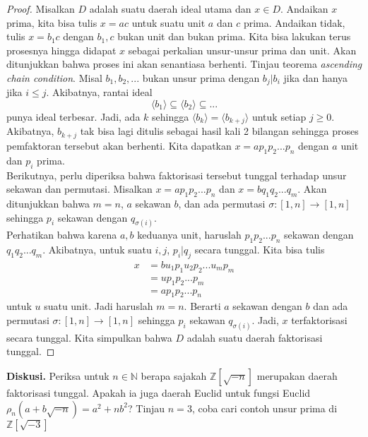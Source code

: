 	\begin{proof}
		Misalkan $D$ adalah suatu daerah ideal utama dan $x \in D$. Andaikan $x$ prima, kita bisa tulis $x = ac$ untuk suatu unit $a$ dan $c$ prima. Andaikan tidak, tulis $x = b_1 c$ dengan $b_1, c$ bukan unit dan bukan prima. Kita bisa lakukan terus prosesnya hingga didapat $x$ sebagai perkalian unsur-unsur prima dan unit. Akan ditunjukkan bahwa proses ini akan senantiasa berhenti. Tinjau teorema \textit{ascending chain condition}. Misal $b_1, b_2, ...$ bukan unsur prima dengan $b_j | b_i$ jika dan hanya jika $i \le j$. Akibatnya, rantai ideal $$\langle b_1 \rangle \subseteq \langle b_2 \rangle \subseteq ...$$punya ideal terbesar. Jadi, ada $k$ sehingga $\langle b_k \rangle = \langle b_{k+j} \rangle$ untuk setiap $j \ge 0$. Akibatnya, $b_{k+j}$ tak bisa lagi ditulis sebagai hasil kali 2 bilangan sehingga proses pemfaktoran tersebut akan berhenti. Kita dapatkan $x = ap_1p_2...p_n$ dengan $a$ unit dan $p_i$ prima.\\
		
		Berikutnya, perlu diperiksa bahwa faktorisasi tersebut tunggal terhadap unsur sekawan dan permutasi. Misalkan $x = ap_1p_2...p_n$ dan $x = bq_1q_2...q_m$. Akan ditunjukkan bahwa $m = n$, $a$ sekawan $b$, dan ada permutasi $\sigma: [1,n] \rightarrow [1,n]$ sehingga $p_i$ sekawan dengan $q_{\sigma(i)}$.\\
		
		Perhatikan bahwa karena $a,b$ keduanya unit, haruslah $p_1p_2...p_n$ sekawan dengan $q_1q_2...q_m$. Akibatnya, untuk suatu $i,j$, $p_i | q_j$ secara tunggal. Kita bisa tulis \begin{equation*}
		\begin{split}
			x & = b u_1 p_1 u_2 p_2 ... u_m p_m\\
			& = u p_1 p_2 ... p_m\\
			& = ap_1p_2...p_n
		\end{split}
		\end{equation*}
		untuk $u$ suatu unit. Jadi haruslah $m = n$. Berarti $a$ sekawan dengan $b$ dan ada permutasi $\sigma: [1,n] \rightarrow [1,n]$ sehingga $p_i$ sekawan $q_{\sigma({i})}$. Jadi, $x$ terfaktorisasi secara tunggal. Kita simpulkan bahwa $D$ adalah suatu daerah faktorisasi tunggal.
	\end{proof}
	\textbf{Diskusi.} Periksa untuk $n \in \mathbb{N}$ berapa sajakah $\mathbb{Z}[\sqrt{-n}]$ merupakan daerah faktorisasi tunggal. Apakah ia juga daerah Euclid untuk fungsi Euclid $\rho_n (a+b\sqrt{-n}) = a^2 + nb^2$? Tinjau $n = 3$, coba cari contoh unsur prima di $\mathbb{Z}[\sqrt{-3}]$
